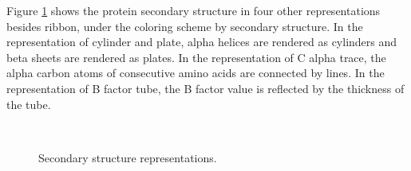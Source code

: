 Figure \ref{iview:secondarystructure} shows the protein secondary structure in four other representations besides ribbon, under the coloring scheme by secondary structure. In the representation of cylinder and plate, alpha helices are rendered as cylinders and beta sheets are rendered as plates. In the representation of C alpha trace, the alpha carbon atoms of consecutive amino acids are connected by lines. In the representation of B factor tube, the B factor value is reflected by the thickness of the tube.

\begin{figure}
\centering
{}
\\
\caption{Secondary structure representations.}
\label{iview:secondarystructure}
\end{figure}

